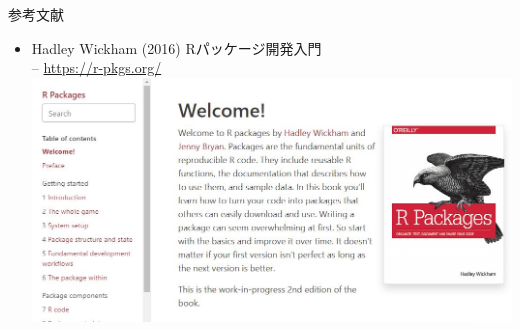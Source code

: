 \documentclass[
  a5paper,
  landscape,
  notitlepage]{report}
\providecommand{\tightlist}{%
  \setlength{\itemsep}{0pt}\setlength{\parskip}{0pt}}
\begin{document}
\newpage

\fontsize{32pt}{32pt}\selectfont

\begin{center}
参考文献
\end{center}

\fontsize{20pt}{20pt}\selectfont

\begin{itemize}
\tightlist
\item
  Hadley Wickham (2016) Rパッケージ開発入門\\
  -- \url{https://r-pkgs.org/}\\
  \includegraphics{image/r_packages_web.jpg}
\end{itemize}
\end{document}
